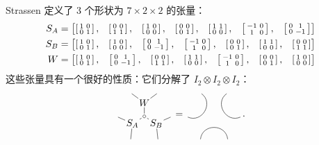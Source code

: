 Strassen 定义了 3 个形状为 $7\times 2\times 2$ 的张量：
\begin{align*}
   \renewcommand*{\arraystretch}{1}
S_A &= \begin{bmatrix}
\smat{1 & 0\\0 & 1}, &
\smat{0 & 0\\1 & 1}, &
\smat{1 & 0\\0 & 0}, &
\smat{0 & 0\\0 & 1}, &
\smat{1 & 1\\0 & 0}, &
\smat{-1 & 0\\1 & 0}, &
\smat{0 & 1\\0 & -1}
\end{bmatrix}
\\
S_B &= \begin{bmatrix}
\smat{1 & 0\\0 & 1}, &
\smat{1 & 0\\0 & 0}, &
\smat{0 & 1\\0 & -1}, &
\smat{-1 & 0\\1 & 0}, &
\smat{0 & 0\\0 & 1}, &
\smat{1 & 1\\0 & 0}, &
\smat{0 & 0\\1 & 1}
\end{bmatrix}
\\
W &= \begin{bmatrix}
\smat{1 & 0\\0 & 1}, &
\smat{0 & 1\\0 & -1}, &
\smat{0 & 0\\1 & 1}, &
\smat{1 & 1\\0 & 0}, &
\smat{-1 & 0\\1 & 0}, &
\smat{0 & 0\\0 & 1}, &
\smat{1 & 0\\0 & 0}
\end{bmatrix}
\end{align*}
这些张量具有一个很好的性质：它们分解了 $I_2\otimes I_2\otimes I_2$：
\[
\begin{tikzpicture}[inner sep=1pt, baseline=.0em]
    \node (m) at (0,0) {$\sbullet$};
    \node (W) at (0,.5) {$W$};
    \node (SB) at (-30:.5) {$S_B$};
    \node (SA) at (-150:.5) {$S_A$};
    \node (w1) at (60:1) {};
    \node (w2) at (120:1) {};
    \node (sa1) at (-120:1) {};
    \node (sa2) at (-180:1) {};
    \node (sb1) at (-0:1) {};
    \node (sb2) at (-60:1) {};
    \draw (m) -- (W);
    \draw (m) -- (SA);
    \draw (m) -- (SB);
    \draw (W) -- (w1) {};
    \draw (W) -- (w2) {};
    \draw (SB) -- (sb1) {};
    \draw (SB) -- (sb2) {};
    \draw (SA) -- (sa1) {};
    \draw (SA) -- (sa2) {};
\end{tikzpicture}
=
\begin{tikzpicture}[inner sep=1pt, baseline=.0em]
    \node (m) at (0,0) {};
    \node (W) at (0,.5) {};
    \node (SB) at (-30:.5) {};
    \node (SA) at (-150:.5) {};
    \node (w1) at (60:1) {};
    \node (w2) at (120:1) {};
    \node (sa1) at (-120:1) {};
    \node (sa2) at (-180:1) {};
    \node (sb1) at (-0:1) {};
    \node (sb2) at (-60:1) {};
    \draw (sa2) .. controls (SA) and (W) .. (w2);
    \draw (sa1) .. controls (SA) and (SB) .. (sb2);
    \draw (sb1) .. controls (SB) and (W) .. (w1);
\end{tikzpicture}
.
\]
